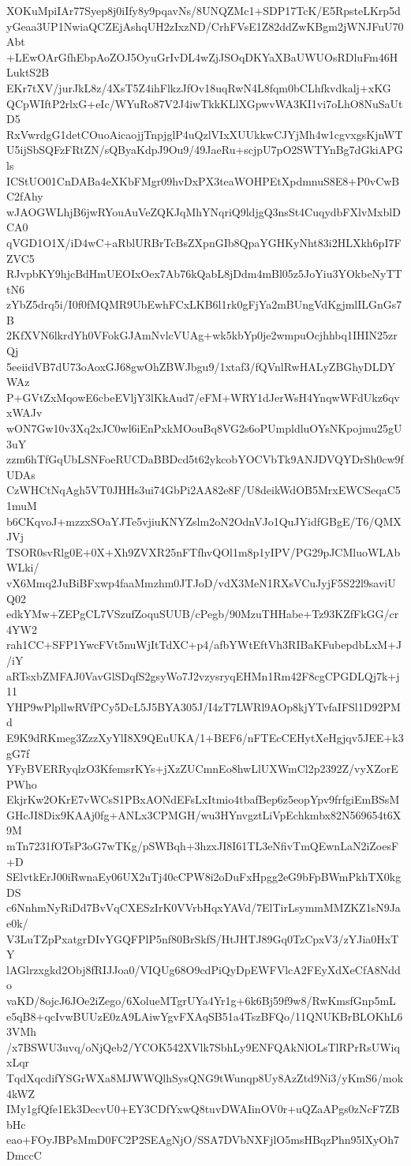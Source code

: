 XOKuMpiIAr77Syep8j0iIfy8y9pqavNs/8UNQZMc1+SDP17TcK/E5RpsteLKrp5d
yGeaa3UP1NwiaQCZEjAshqUH2zIxzND/CrhFVsE1Z82ddZwKBgm2jWNJFuU70Abt
+LEwOArGfhEbpAoZOJ5OyuGrIvDL4wZjJSOqDKYaXBaUWUOsRDluFm46HLuktS2B
EKr7tXV/jurJkL8z/4XsT5Z4ihFlkzJfOv18uqRwN4L8fqm0bCLhfkvdkalj+xKG
QCpWIftP2rlxG+eIc/WYuRo87V2J4iwTkkKLlXGpwvWA3KI1vi7oLhO8NuSaUtD5
RxVwrdgG1detCOuoAicaojjTnpjglP4uQzlVIxXUUkkwCJYjMh4w1cgvxgsKjnWT
U5ijSbSQFzFRtZN/sQByaKdpJ9Ou9/49JaeRu+scjpU7pO2SWTYnBg7dGkiAPGls
ICStUO01CnDABa4eXKbFMgr09hvDxPX3teaWOHPEtXpdmnuS8E8+P0vCwBC2fAhy
wJAOGWLhjB6jwRYouAuVeZQKJqMhYNqriQ9ldjgQ3nsSt4CuqydbFXlvMxblDCA0
qVGD1O1X/iD4wC+aRblURBrTcBsZXpnGIb8QpaYGHKyNht83i2HLXkh6pI7FZVC5
RJvpbKY9hjcBdHmUEOIxOex7Ab76kQabL8jDdm4mBl05z5JoYiu3YOkbeNyTTtN6
zYbZ5drq5i/I0f0fMQMR9UbEwhFCxLKB6l1rk0gFjYa2mBUngVdKgjmlILGnGs7B
2KfXVN6lkrdYh0VFokGJAmNvlcVUAg+wk5kbYp0je2wmpuOcjhhbq1IHIN25zrQj
5eeiidVB7dU73oAoxGJ68gwOhZBWJbgu9/1xtaf3/fQVnlRwHALyZBGhyDLDYWAz
P+GVtZxMqowE6cbeEVljY3lKkAud7/eFM+WRY1dJerWsH4YnqwWFdUkz6qvxWAJv
wON7Gw10v3Xq2xJC0wl6iEnPxkMOouBq8VG2s6oPUmpldluOYsNKpojmu25gU3uY
zzm6hTfGqUbLSNFoeRUCDaBBDcd5t62ykcobYOCVbTk9ANJDVQYDrSh0cw9fUDAs
CzWHCtNqAgh5VT0JHHs3ui74GbPi2AA82e8F/U8deikWdOB5MrxEWCSeqaC51muM
b6CKqvoJ+mzzxSOaYJTe5vjiuKNYZslm2oN2OdnVJo1QuJYidfGBgE/T6/QMXJVj
TSOR0svRlg0E+0X+Xh9ZVXR25nFTfhvQOl1m8p1yIPV/PG29pJCMluoWLAbWLki/
vX6Mmq2JuBiBFxwp4faaMmzhm0JTJoD/vdX3MeN1RXsVCuJyjF5S22l9saviUQ02
edkYMw+ZEPgCL7VSzufZoquSUUB/cPegb/90MzuTHHabe+Tz93KZfFkGG/cr4YW2
rah1CC+SFP1YwcFVt5nuWjItTdXC+p4/afbYWtEftVh3RIBaKFubepdbLxM+J/iY
aRTsxbZMFAJ0VavGlSDqfS2gsyWo7J2vzysryqEHMn1Rm42F8cgCPGDLQj7k+j11
YHP9wPlpllwRVfPCy5DcL5J5BYA305J/I4zT7LWRl9AOp8kjYTvfaIFSl1D92PMd
E9K9dRKmeg3ZzzXyYlI8X9QEuUKA/1+BEF6/nFTEcCEHytXeHgjqv5JEE+k3gG7f
YFyBVERRyqlzO3KfemsrKYs+jXzZUCmnEo8hwLlUXWmCl2p2392Z/vyXZorEPWho
EkjrKw2OKrE7vWCsS1PBxAONdEFsLxItmio4tbafBep6z5eopYpv9frfgiEmBSsM
GHcJI8Dix9KAAj0fg+ANLx3CPMGH/wu3HYnvgztLiVpEchkmbx82N569654t6X9M
mTn7231fOTsP3oG7wTKg/pSWBqh+3hzxJI8I61TL3eNfivTmQEwnLaN2iZoesF+D
SElvtkErJ00iRwnaEy06UX2uTj40cCPW8i2oDuFxHpgg2eG9bFpBWmPkhTX0kgDS
c6NnhmNyRiDd7BvVqCXESzIrK0VVrbHqxYAVd/7ElTirLsymmMMZKZ1sN9Jae0k/
V3LuTZpPxatgrDIvYGQFPlP5nf80BrSkfS/HtJHTJ89Gq0TzCpxV3/zYJia0HxTY
lAGlrzxgkd2Obj8fRIJJoa0/VIQUg68O9cdPiQyDpEWFVlcA2FEyXdXeCfA8Nddo
vaKD/8ojcJ6JOe2iZego/6XolueMTgrUYa4Yr1g+6k6Bj59f9w8/RwKmsfGnp5mL
e5qB8+qcIvwBUUzE0zA9LAiwYgvFXAqSB51a4TszBFQo/11QNUKBrBLOKhL63VMh
/x7BSWU3uvq/oNjQeb2/YCOK542XVlk7SbhLy9ENFQAkNlOLsTlRPrRsUWiqxLqr
TqdXqcdifYSGrWXa8MJWWQlhSysQNG9tWunqp8Uy8AzZtd9Ni3/yKmS6/mok4kWZ
IMy1gfQfe1Ek3DecvU0+EY3CDfYxwQ8tuvDWAIinOV0r+uQZaAPgs0zNcF7ZBbHc
eao+FOyJBPsMmD0FC2P2SEAgNjO/SSA7DVbNXFjlO5msHBqzPhn95lXyOh7DmccC
